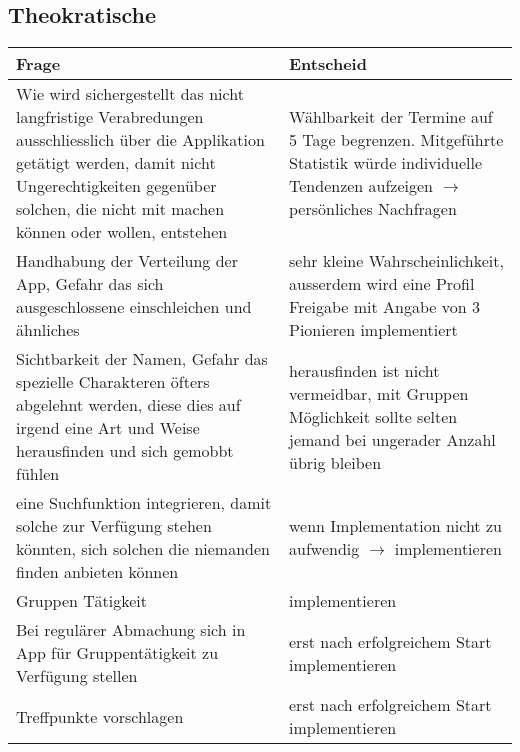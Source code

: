 \subsection{Theokratische}

\begin{tabularx}{\textwidth}{X|X}
Frage & Entscheid \\\hline
Wie wird sichergestellt das nicht langfristige Verabredungen ausschliesslich über die Applikation getätigt werden, damit nicht Ungerechtigkeiten gegenüber solchen, die nicht mit machen können oder wollen, entstehen & Wählbarkeit der Termine auf 5 Tage begrenzen. Mitgeführte Statistik würde individuelle Tendenzen aufzeigen $\rightarrow$ persönliches Nachfragen \\\hline
Handhabung der Verteilung der App, Gefahr das sich ausgeschlossene einschleichen und ähnliches & sehr kleine Wahrscheinlichkeit, ausserdem wird eine Profil Freigabe mit Angabe von 3 Pionieren implementiert\\\hline
Sichtbarkeit der Namen, Gefahr das spezielle Charakteren öfters abgelehnt werden, diese dies auf irgend eine Art und Weise herausfinden und sich gemobbt fühlen & herausfinden ist nicht vermeidbar, mit Gruppen Möglichkeit sollte selten jemand bei ungerader Anzahl übrig bleiben\\\hline
eine Suchfunktion integrieren, damit solche zur Verfügung stehen könnten, sich solchen die niemanden finden anbieten können & wenn Implementation nicht zu aufwendig $\rightarrow$ implementieren\\\hline
Gruppen Tätigkeit & implementieren \\\hline
Bei regulärer Abmachung sich in App für Gruppentätigkeit zu Verfügung stellen & erst nach erfolgreichem Start implementieren\\\hline
Treffpunkte vorschlagen & erst nach erfolgreichem Start implementieren\\
\end{tabularx}


